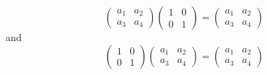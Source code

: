 \documentclass{ximera}
\begin{document}
\[
\left(\begin{array}{cc}
a_{1} & a_{2}\\
a_{3} & a_{4}
\end{array}\right) \left(\begin{array}{cc}
1 & 0\\
0 &1
\end{array}\right) = \left(\begin{array}{cc}
a_{1} & a_{2}\\
a_{3} & a_{4}
\end{array}\right)
\]
and
\[\left(\begin{array}{cc}
1 & 0\\
0 &1
\end{array}\right)\left(\begin{array}{cc}
a_{1} & a_{2}\\
a_{3} & a_{4}
\end{array}\right)= \left(\begin{array}{cc}
a_{1} & a_{2}\\
a_{3} & a_{4}
\end{array}\right) \]
\end{document}
